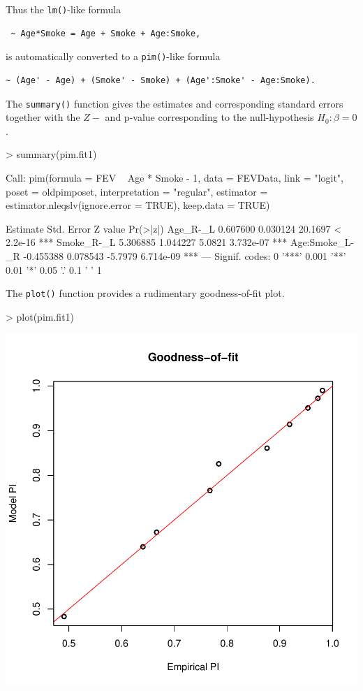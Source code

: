 \documentclass[12pt]{article}
\begin{document}
Thus the \texttt{lm()}-like formula 
\begin{verbatim}
 ~ Age*Smoke = Age + Smoke + Age:Smoke,
\end{verbatim}
is automatically converted to a \texttt{pim()}-like formula
\begin{verbatim}
~ (Age' - Age) + (Smoke' - Smoke) + (Age':Smoke' - Age:Smoke).
\end{verbatim}
The \texttt{summary()} function gives the estimates and corresponding standard errors together with the $Z-$ and p-value corresponding to the null-hypothesis $H_0: \beta = 0$. 
\begin{Schunk}
\begin{Sinput}
> summary(pim.fit1)
\end{Sinput}
\begin{Soutput}
Call:
pim(formula = FEV ~ Age * Smoke - 1, data = FEVData, link = "logit", 
    poset = oldpimposet, interpretation = "regular", estimator = estimator.nleqslv(ignore.error = TRUE), 
    keep.data = TRUE)

                Estimate Std. Error Z value  Pr(>|z|)    
Age_R-_L        0.607600   0.030124 20.1697 < 2.2e-16 ***
Smoke_R-_L      5.306885   1.044227  5.0821 3.732e-07 ***
Age:Smoke_L-_R -0.455388   0.078543 -5.7979 6.714e-09 ***
---
Signif. codes:  0 '***' 0.001 '**' 0.01 '*' 0.05 '.' 0.1 ' ' 1 
\end{Soutput}
\end{Schunk}
The \texttt{plot()} function provides a rudimentary goodness-of-fit plot.
\begin{center}
\begin{Schunk}
\begin{Sinput}
> plot(pim.fit1)
\end{Sinput}
\end{Schunk}
\includegraphics{pim-004}
\end{center}
\end{document}
